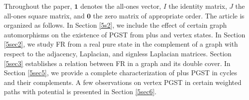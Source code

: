 \documentclass[12pt,a4paper]{article}
\newtheorem{prop}{Proposition}
\def \Rl {{\mathbbm R}}
\def \u {{\bf u}}
\newcommand{\cb}[1]{\left\lbrace #1\right\rbrace}
\begin{document}

Throughout the paper, $\mathbf{1}$ denotes the all-ones vector, $I$ the identity matrix, $J$ the all-ones square matrix, and $\mathbf{0}$ the zero matrix of appropriate order. 
The article is organized as follows. In Section \ref{5s2}, we include the effect of certain graph automorphisms on the existence of PGST from plus and vertex states. In Section \ref{5sec2}, we study FR from a real pure state in the complement of a graph with respect to the adjacency, Laplacian, and signless Laplacian matrices. Section \ref{5sec3} establishes a relation between FR in a graph and its double cover. In Section \ref{5sec5}, we provide a complete characterization of plus PGST in cycles and their complements. A few observations on vertex PGST in certain weighted paths with potential is presented in Section \ref{5sec6}. 
\end{document}
